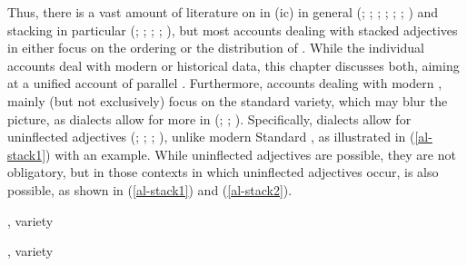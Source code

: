 \documentclass[output=paper,colorlinks,citecolor=brown]{langscibook}
\begin{document}
Thus, there is a vast amount of literature on  in (ic) in general 
(\citealp{Gallmann1996}; \citealp{Kester1996}; \citealp{leu2015architecture}; \citealp{olsen1991deutsche}; \citealp{Pfaff2015, Pfaff2017}; \citealp{roehrs2015inflections}; \citealp{RoehrsJulien2014adjectives}) and stacking in particular (\citealp{Bildhauer2019}; \citealp{MunzbergBildhauer2020}; \citealp{olsen1991deutsche}; \citealp{Roehrs2009}; \citealp{Scott2002}), but most accounts dealing with stacked adjectives in  either focus on the ordering or the distribution of . While the individual accounts deal with modern  or historical data, this chapter discusses both, aiming at a unified account of parallel . Furthermore, accounts dealing with modern , mainly (but not exclusively) focus on the standard variety, which may blur the picture, as dialects allow for more  in  (\citealp{baechler2017absolute}; \citealp{leu2015architecture}; \citealp{Rehn2019}).
Specifically,  dialects allow for uninflected  adjectives (\citealp{birlinger1868alemannische}; \citealp{Rehn2017}; \citealp{Schirmunski1962}; \citealp{Staedele1927}), unlike modern Standard , as illustrated in (\ref{al-stack1}) with an  example. While uninflected adjectives are possible, they are not obligatory, but in those contexts in which uninflected adjectives occur,  is also possible, as shown in (\ref{al-stack1}) and (\ref{al-stack2}).
\newpage

\ea \label{al-stack1}  ,  variety\\
\z 
\z

\ea \label{al-stack2} ,  variety\\
\z 
\z
\end{document}
